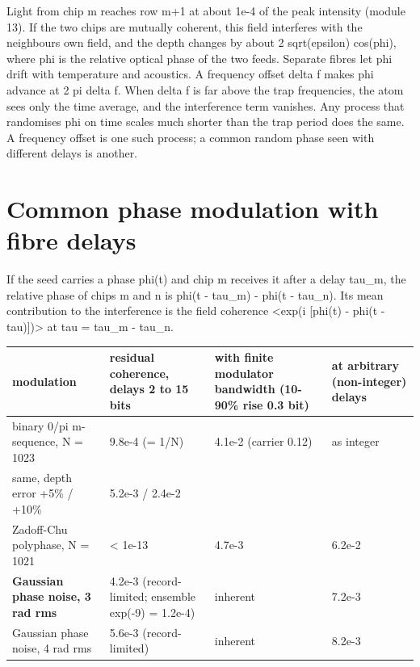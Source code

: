 Light from chip m reaches row m+1 at about 1e-4 of the peak intensity
(module 13). If the two chips are mutually coherent, this field
interferes with the neighbour\textquotesingle s own field, and the depth
changes by about 2 sqrt(epsilon) cos(phi), where phi is the relative
optical phase of the two feeds. Separate fibres let phi drift with
temperature and acoustics. A frequency offset delta f makes phi advance
at 2 pi delta f. When delta f is far above the trap frequencies, the
atom sees only the time average, and the interference term vanishes. Any
process that randomises phi on time scales much shorter than the trap
period does the same. A frequency offset is one such process; a common
random phase seen with different delays is another.

\hypertarget{3-common-phase-modulation-with-fibre-delays}{%
\section{Common phase modulation with fibre
delays}\label{row_coherence-3-common-phase-modulation-with-fibre-delays}}

If the seed carries a phase phi(t) and chip m receives it after a delay
tau\_m, the relative phase of chips m and n is phi(t - tau\_m) - phi(t -
tau\_n). Its mean contribution to the interference is the field
coherence \textbar\textless exp(i {[}phi(t) - phi(t -
tau){]})\textgreater\textbar{} at tau = tau\_m - tau\_n.

{\footnotesize
\begin{longtable}[]{@{}>{\raggedright\arraybackslash}p{0.186\dimexpr(\linewidth-8\tabcolsep)\relax}>{\raggedright\arraybackslash}p{0.291\dimexpr(\linewidth-8\tabcolsep)\relax}>{\raggedright\arraybackslash}p{0.314\dimexpr(\linewidth-8\tabcolsep)\relax}>{\raggedright\arraybackslash}p{0.209\dimexpr(\linewidth-8\tabcolsep)\relax}@{}}
\toprule\noalign{}
modulation & residual coherence, delays 2 to 15 bits & with finite
modulator bandwidth (10-90\% rise 0.3 bit) & at arbitrary (non-integer)
delays \\
\midrule\noalign{}
\endhead
\bottomrule\noalign{}
\endlastfoot
binary 0/pi m-sequence, N = 1023 & 9.8e-4 (= 1/N) & 4.1e-2 (carrier
0.12) & as integer \\
same, depth error +5\% / +10\% & 5.2e-3 / 2.4e-2 & & \\
Zadoff-Chu polyphase, N = 1021 & \textless{} 1e-13 & 4.7e-3 & 6.2e-2 \\
\textbf{Gaussian phase noise, 3 rad rms} & 4.2e-3 (record-limited;
ensemble exp(-9) = 1.2e-4) & inherent & 7.2e-3 \\
Gaussian phase noise, 4 rad rms & 5.6e-3 (record-limited) & inherent &
8.2e-3 \\
\end{longtable}
}

